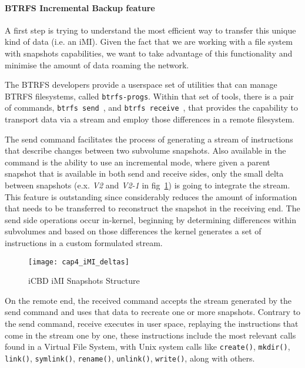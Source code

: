 \paragraph{BTRFS Incremental Backup feature}
\label{par:impl_incremental_btrfs}

A first step is trying to understand the most efficient way to transfer this unique kind of data (i.e. an iMI). Given the fact that we are working with a file system with snapshots capabilities, we want to take advantage of this functionality and minimise the amount of data roaming the network.

The BTRFS developers provide a userspace set of utilities that can manage BTRFS filesystems, called \texttt{btrfs-progs}. Within that set of tools, there is a pair of commands, \texttt{btrfs send}~\cite{btrfs_send}, and \texttt{btrfs receive}~\cite{btrfs_receive}, that provides the capability to transport data via a stream and employ those differences in a remote filesystem. 

The send command facilitates the process of generating a stream of instructions that describe changes between two subvolume snapshots. Also available in the command is the ability to use an incremental mode, where given a parent snapshot that is available in both send and receive sides, only the small delta between snapshots (e.x. \textit{V2} and \textit{V2-1} in fig~\ref{fig:icbd_rep_imi_snap}) is going to integrate the stream. This feature is outstanding since considerably reduces the amount of information that needs to be transferred to reconstruct the snapshot in the receiving end. The send side operations occur in-kernel, beginning by determining differences within subvolumes and based on those differences the kernel generates a set of instructions in a custom formulated stream.

\begin{figure}[htbp]
    \centering
    \texttt{[image: cap4\_iMI\_deltas]}
    \caption{iCBD iMI Snapshots Structure}
    \label{fig:icbd_rep_imi_snap}
\end{figure}

On the remote end, the received command accepts the stream generated by the send command and uses that data to recreate one or more snapshots. Contrary to the send command, receive executes in user space, replaying the instructions that come in the stream one by one, these instructions include the most relevant calls found in a Virtual File System, with Unix system calls like \texttt{create()}, \texttt{mkdir()}, \texttt{link()}, \texttt{symlink()}, \texttt{rename()}, \texttt{unlink()}, \texttt{write()}, along with others.~\cite{btrfs_design}


